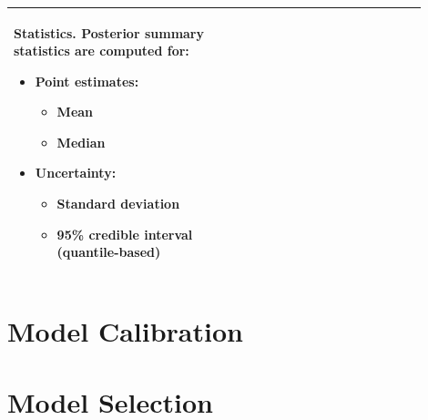 \documentclass{article}
\begin{document}
\begin{appendix}
{\begin{table}[H]
\begin{tabular}{| p{0.45\linewidth} | p{0.45\linewidth} |}
\begin{itemize}
			\end{itemize}
			\vspace{5pt}
			{\bf Statistics.} Posterior summary statistics are computed for:
			\begin{itemize}
				\item Point estimates: 
				\begin{itemize}
					\item Mean 
					\item Median
				\end{itemize}
				\item Uncertainty: 
				\begin{itemize}
					\item Standard deviation
					\item 95\% credible interval (quantile-based)
				\end{itemize}
			\end{itemize}\\
		\hline 
	\end{tabular}
\end{table}}



\newpage
\section{Model Calibration}
\label{sec::PPC1}


\begin{landscape}



\end{landscape}


\newpage
\section{Model Selection}
\label{sec::PPC2}


\end{appendix}
\end{document}

